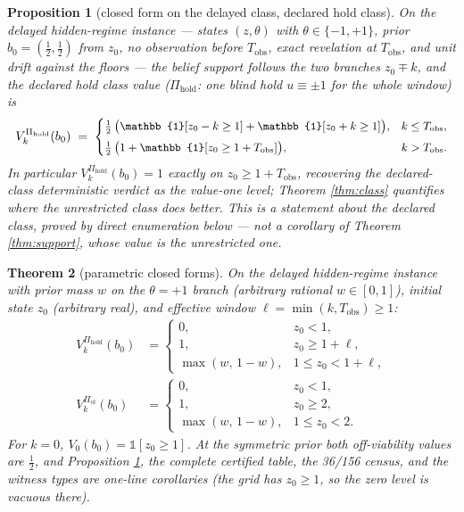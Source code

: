 \documentclass[10pt,twocolumn]{article}
\theoremstyle{plain}
\newtheorem{theorem}{Theorem}
\newtheorem{proposition}[theorem]{Proposition}
\theoremstyle{definition}
\theoremstyle{remark}
\begin{document}
\begin{proposition}[closed form on the delayed class, declared hold class]
\label{cor:closed}
On the delayed hidden-regime instance --- states \((z, \theta)\) with
\(\theta \in \{-1, +1\}\), prior \(b_{0} = (\tfrac{1}{2}, \tfrac{1}{2})\)
from \(z_{0}\), no observation before \(T_{\mathrm{obs}}\), exact
revelation at \(T_{\mathrm{obs}}\), and unit drift against the floors ---
the belief support follows the two branches \(z_{0} \mp k\), and the
\emph{declared hold class} value (\(\Pi_{\mathrm{hold}}\): one blind
hold \(u \equiv \pm 1\) for the whole window) is
\[
\small
V^{\Pi_{\mathrm{hold}}}_{k}(b_{0}) \;=\;
\begin{cases}
\tfrac{1}{2}\,\bigl(\mathbb{1}[z_{0} - k \ge 1] + \mathbb{1}[z_{0} + k \ge 1]\bigr), & k \le T_{\mathrm{obs}},\\[1ex]
\tfrac{1}{2}\,\bigl(1 + \mathbb{1}[z_{0} \ge 1 + T_{\mathrm{obs}}]\bigr), & k > T_{\mathrm{obs}}.
\end{cases}
\]
In particular \(V^{\Pi_{\mathrm{hold}}}_{k}(b_{0}) = 1\) exactly on
\(z_{0} \ge 1 + T_{\mathrm{obs}}\), recovering the declared-class
deterministic verdict as the value-one level; Theorem \ref{thm:class}
quantifies where the unrestricted class does better. This is a statement
about the declared class, proved by direct enumeration below --- not a
corollary of Theorem \ref{thm:support}, whose value is the unrestricted
one.
\end{proposition}
\begin{theorem}[parametric closed forms]\label{thm:parametric}
On the delayed hidden-regime instance with prior mass \(w\) on the
\(\theta = +1\) branch (arbitrary rational \(w \in [0,1]\)), initial
state \(z_{0}\) (arbitrary real), and effective window
\(\ell = \min(k, T_{\mathrm{obs}}) \ge 1\):
\begin{align*}
V^{\Pi_{\mathrm{hold}}}_{k}(b_{0}) &=
\begin{cases} 0, & z_{0} < 1,\\
1, & z_{0} \ge 1 + \ell,\\
\max(w,\, 1 - w), & 1 \le z_{0} < 1 + \ell,
\end{cases}
\\[0.4ex]
V^{\Pi_{\mathrm{ol}}}_{k}(b_{0}) &=
\begin{cases} 0, & z_{0} < 1,\\
1, & z_{0} \ge 2,\\
\max(w,\, 1 - w), & 1 \le z_{0} < 2.
\end{cases}
\end{align*}
For \(k = 0\), \(V_{0}(b_{0}) = \mathbb{1}[z_{0} \ge 1]\). At the
symmetric prior both off-viability values are \(\tfrac12\), and
Proposition \ref{cor:closed}, the complete certified table, the
36/156 census, and the witness types are one-line corollaries (the grid
has \(z_{0} \ge 1\), so the zero level is vacuous there).
\end{theorem}
\end{document}
